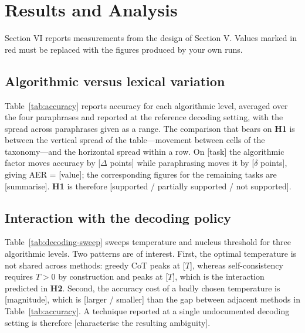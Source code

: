 \documentclass[conference]{IEEEtran}
\begin{document}
\section{Results and Analysis}
\label{sec:results}

Section VI reports measurements from the design of Section V. Values marked in red must be replaced with the figures produced by your own runs.

\subsection{Algorithmic versus lexical variation}
\label{sec:alg-vs-lex}

Table~\ref{tab:accuracy} reports accuracy for each algorithmic level, averaged over the four paraphrases and reported at the reference decoding setting, with the spread across paraphrases given as a range. The comparison that bears on \textbf{H1} is between the vertical spread of the table---movement between cells of the taxonomy---and the horizontal spread within a row. On \textcolor{BrickRed}{[task]} the algorithmic factor moves accuracy by \textcolor{BrickRed}{[$\Delta$ points]} while paraphrasing moves it by \textcolor{BrickRed}{[$\delta$ points]}, giving AER = \textcolor{BrickRed}{[value]}; the corresponding figures for the remaining tasks are \textcolor{BrickRed}{[summarise]}. \textbf{H1} is therefore \textcolor{BrickRed}{[supported / partially supported / not supported]}.

\subsection{Interaction with the decoding policy}
\label{sec:decoding-interaction}

Table~\ref{tab:decoding-sweep} sweeps temperature and nucleus threshold for three algorithmic levels. Two patterns are of interest. First, the optimal temperature is not shared across methods: greedy CoT peaks at \textcolor{BrickRed}{[$T$]}, whereas self-consistency requires $T > 0$ by construction and peaks at \textcolor{BrickRed}{[$T$]}, which is the interaction predicted in \textbf{H2}. Second, the accuracy cost of a badly chosen temperature is \textcolor{BrickRed}{[magnitude]}, which is \textcolor{BrickRed}{[larger / smaller]} than the gap between adjacent methods in Table~\ref{tab:accuracy}. A technique reported at a single undocumented decoding setting is therefore \textcolor{BrickRed}{[characterise the resulting ambiguity]}.
\end{document}
